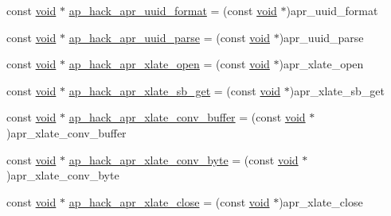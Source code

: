 \begin{DoxyCompactItemize}
\item 
const \hyperlink{group__MOD__ISAPI_gacd6cdbf73df3d9eed42fa493d9b621a6}{void} $\ast$ \hyperlink{srclib_2apr-util_2exports_8c_aded18c0f2e4e8baefe7eec5272c3296b}{ap\+\_\+hack\+\_\+apr\+\_\+uuid\+\_\+format} = (const \hyperlink{group__MOD__ISAPI_gacd6cdbf73df3d9eed42fa493d9b621a6}{void} $\ast$)apr\+\_\+uuid\+\_\+format
\item 
const \hyperlink{group__MOD__ISAPI_gacd6cdbf73df3d9eed42fa493d9b621a6}{void} $\ast$ \hyperlink{srclib_2apr-util_2exports_8c_adec9ccc894bcff142c88307e9c72f574}{ap\+\_\+hack\+\_\+apr\+\_\+uuid\+\_\+parse} = (const \hyperlink{group__MOD__ISAPI_gacd6cdbf73df3d9eed42fa493d9b621a6}{void} $\ast$)apr\+\_\+uuid\+\_\+parse
\item 
const \hyperlink{group__MOD__ISAPI_gacd6cdbf73df3d9eed42fa493d9b621a6}{void} $\ast$ \hyperlink{srclib_2apr-util_2exports_8c_a04ff1849517c3ac7c9df23183096756f}{ap\+\_\+hack\+\_\+apr\+\_\+xlate\+\_\+open} = (const \hyperlink{group__MOD__ISAPI_gacd6cdbf73df3d9eed42fa493d9b621a6}{void} $\ast$)apr\+\_\+xlate\+\_\+open
\item 
const \hyperlink{group__MOD__ISAPI_gacd6cdbf73df3d9eed42fa493d9b621a6}{void} $\ast$ \hyperlink{srclib_2apr-util_2exports_8c_a1952b325a3bac1a1d489b13a0a23ea26}{ap\+\_\+hack\+\_\+apr\+\_\+xlate\+\_\+sb\+\_\+get} = (const \hyperlink{group__MOD__ISAPI_gacd6cdbf73df3d9eed42fa493d9b621a6}{void} $\ast$)apr\+\_\+xlate\+\_\+sb\+\_\+get
\item 
const \hyperlink{group__MOD__ISAPI_gacd6cdbf73df3d9eed42fa493d9b621a6}{void} $\ast$ \hyperlink{srclib_2apr-util_2exports_8c_a2cb6b15302f6fa4c0ea683926e0014f2}{ap\+\_\+hack\+\_\+apr\+\_\+xlate\+\_\+conv\+\_\+buffer} = (const \hyperlink{group__MOD__ISAPI_gacd6cdbf73df3d9eed42fa493d9b621a6}{void} $\ast$)apr\+\_\+xlate\+\_\+conv\+\_\+buffer
\item 
const \hyperlink{group__MOD__ISAPI_gacd6cdbf73df3d9eed42fa493d9b621a6}{void} $\ast$ \hyperlink{srclib_2apr-util_2exports_8c_ad1d8ada2bb0c68bfa01336921678da44}{ap\+\_\+hack\+\_\+apr\+\_\+xlate\+\_\+conv\+\_\+byte} = (const \hyperlink{group__MOD__ISAPI_gacd6cdbf73df3d9eed42fa493d9b621a6}{void} $\ast$)apr\+\_\+xlate\+\_\+conv\+\_\+byte
\item 
const \hyperlink{group__MOD__ISAPI_gacd6cdbf73df3d9eed42fa493d9b621a6}{void} $\ast$ \hyperlink{srclib_2apr-util_2exports_8c_a6a225875a54194eb11fa3b2b28b45015}{ap\+\_\+hack\+\_\+apr\+\_\+xlate\+\_\+close} = (const \hyperlink{group__MOD__ISAPI_gacd6cdbf73df3d9eed42fa493d9b621a6}{void} $\ast$)apr\+\_\+xlate\+\_\+close
\item 

\end{DoxyCompactItemize}
